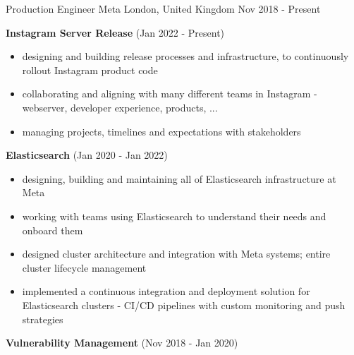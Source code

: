 
\begin{cventries}

  \cventry
    {Production Engineer} %
    {Meta} %
    {London, United Kingdom} %
    {Nov 2018 - Present} %
    {
      \begin{cvitems} %
        \item {
          \textbf{Instagram Server Release} (Jan 2022 - Present)
          \begin{itemize}
            \item {designing and building release processes and infrastructure, to continuously rollout Instagram product code}
            \item {collaborating and aligning with many different teams in Instagram - webserver, developer experience, products, ...}
            \item {managing projects, timelines and expectations with stakeholders}
          \end{itemize}
        }
        \item {
          \textbf{Elasticsearch} (Jan 2020 - Jan 2022)
          \begin{itemize}
            \item {designing, building and maintaining all of Elasticsearch infrastructure at Meta}
            \item {working with teams using Elasticsearch to understand their needs and onboard them}
            \item {designed cluster architecture and integration with Meta systems; entire cluster lifecycle management}
            \item {implemented a continuous integration and deployment solution for Elasticsearch clusters - CI/CD pipelines with custom monitoring and push strategies}
          \end{itemize}
        }
        \item {
          \textbf{Vulnerability Management} (Nov 2018 - Jan 2020)
}
\end{cvitems}}
\end{cventries}
